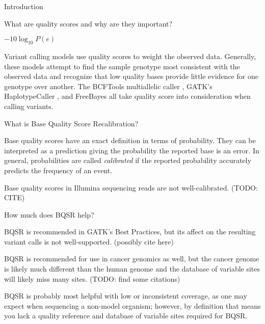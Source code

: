\documentclass{article}
\begin{document}
\linenumbers
\begin{outline}
	\item Introduction
	\begin{outline}
		\item What are quality scores and why are they important? \parencite{ewing_base-calling_1998} \parencite{ewing_base-calling_1998-1}
		\begin{outline}
			\item $-10\log_{10}P(e)$ \parencite{ewing_base-calling_1998} \parencite{ewing_base-calling_1998-1}
			\item Variant calling models use quality scores to weight the observed data. Generally, these models attempt to find the sample genotype most consistent with the observed data and recognize that low quality bases provide little evidence for one genotype over another. The BCFTools multiallelic caller \parencite{li_sequence_2009}, GATK's HaplotypeCaller \parencite{poplin_scaling_2018}, and FreeBayes \parencite{garrison_haplotype-based_2012} all take quality score into consideration when calling variants.
		\end{outline}
		\item What is Base Quality Score Recalibration?
		\begin{outline}
			\item Base quality scores have an exact definition in terms of probability. They can be interpreted as a prediction giving the probability the reported base is an error. In general, probabilities are called \textit{calibrated} if the reported probability accurately predicts the frequency of an event.
			\item Base quality scores in Illumina sequencing reads are not well-calibrated. (TODO: CITE)
		\end{outline}
		\item How much does BQSR help?
		\begin{outline}
			\item BQSR is recommended in GATK's Best Practices, but its affect on the resulting variant calls is not well-supported. (possibly cite \cite{ni_improvement_2016} here)
			\item BQSR is recommended for use in cancer genomics as well, but the cancer genome is likely much different than the human genome and the database of variable sites will likely miss many sites. (TODO: find some citations)
		\end{outline}
		\item BQSR is probably most helpful with low or inconsistent coverage, as one may expect when sequencing a non-model organism; however, by definition that means you lack a quality reference and database of variable sites required for BQSR.

\end{outline}
\end{outline}
\end{document}

